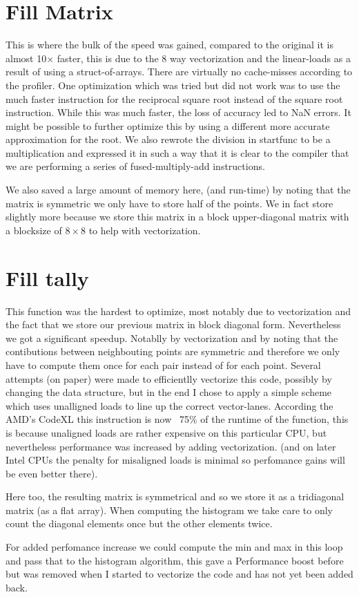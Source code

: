 \section{Fill Matrix}
This is where the bulk of the speed was gained, compared to the original it is almost 10$\times$ faster, this is due to the 8 way vectorization and the linear-loads
 as a result of using a struct-of-arrays. There are virtually no cache-misses according to the profiler. One optimization which was tried but did not work was to use the much faster instruction for the
 reciprocal square root instead of the square root instruction. While this was much faster, the loss of accuracy led to NaN errors. It might be possible to further optimize this by using a different
 more accurate approximation for the root. We also rewrote the division in startfunc to be a multiplication and expressed it in such a way that it is clear to the compiler that we are performing a series of
 fused-multiply-add instructions.
 \par We also saved a large amount of memory here, (and run-time) by noting that the matrix is symmetric we only have to store half of the points. We in fact store slightly more because we store this matrix in a block upper-diagonal matrix with
 a blocksize of $8\times8$ to help with vectorization.

 \section{Fill tally}
 \par This function was the hardest to optimize, most notably due to vectorization and the fact that we store our previous matrix in block diagonal form. Nevertheless we got a
 significant speedup. Notablly by vectorization and by noting that the contibutions between neighbouting points are symmetric and therefore we only have to compute them once for each pair instead of for
 each point. Several attempts (on paper) were made to efficientlly vectorize this code, possibly by changing the data structure, but in the end I chose to apply a simple scheme which uses unalligned loads to line up
 the correct vector-lanes. According the AMD's CodeXL this instruction is now ~75\% of the runtime of the function, this is because unaligned loads are rather expensive on this particular CPU, but nevertheless performance was increased by adding vectorization.
 (and on later Intel CPUs the penalty for misaligned loads is minimal so perfomance gains will be even better there).
 \par Here too, the resulting matrix is symmetrical and so we store it as a tridiagonal matrix (as a flat array). When computing the histogram we take care to only count the diagonal elements once
 but the other elements twice.
 \par For added perfomance increase we could compute the min and max in this loop and pass that to the histogram algorithm, this gave a Performance boost before but was removed when I started to vectorize the code and has not yet been
 added back.

